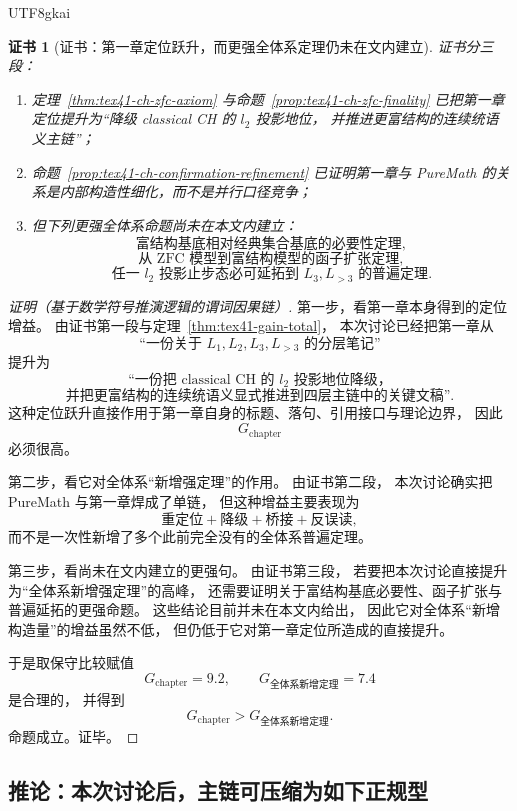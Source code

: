 \documentclass[12pt]{article}
\newtheorem{Certificate}{证书}[section]
\begin{document}
\begin{CJK*}{UTF8}{gkai}
\begin{Certificate}[证书：第一章定位跃升，而更强全体系定理仍未在文内建立]
\label{cert:tex41-gain-internal}
证书分三段：
\begin{enumerate}
  \item 定理~\ref{thm:tex41-ch-zfc-axiom} 与命题~\ref{prop:tex41-ch-zfc-finality} 已把第一章定位提升为“降级 classical CH 的 $l_2$ 投影地位，
    并推进更富结构的连续统语义主链”；
  \item 命题~\ref{prop:tex41-ch-confirmation-refinement} 已证明第一章与 PureMath 的关系是内部构造性细化，而不是并行口径竞争；
  \item 但下列更强全体系命题尚未在本文内建立：
\[
    \text{富结构基底相对经典集合基底的必要性定理},
\]
\[
    \text{从 ZFC 模型到富结构模型的函子扩张定理},
\]
\[
    \text{任一 }l_2\text{ 投影止步态必可延拓到 }L_3,L_{>3}\text{ 的普遍定理}.
\]
\end{enumerate}
\end{Certificate}

\begin{proof}[证明（基于数学符号推演逻辑的谓词因果链）]
第一步，看第一章本身得到的定位增益。
由证书第一段与定理~\ref{thm:tex41-gain-total}，
本次讨论已经把第一章从
\[
  \text{“一份关于 }L_1,L_2,L_3,L_{>3}\text{ 的分层笔记”}
\]
提升为
\[
  \text{“一份把 classical CH 的 }l_2\text{ 投影地位降级，}
\]
\[
  \text{并把更富结构的连续统语义显式推进到四层主链中的关键文稿”}.
\]
这种定位跃升直接作用于第一章自身的标题、落句、引用接口与理论边界，
因此
\[
  G_{\mathrm{chapter}}
\]
必须很高。

第二步，看它对全体系“新增强定理”的作用。
由证书第二段，
本次讨论确实把 PureMath 与第一章焊成了单链，
但这种增益主要表现为
\[
  \text{重定位}
  +
  \text{降级}
  +
  \text{桥接}
  +
  \text{反误读},
\]
而不是一次性新增了多个此前完全没有的全体系普遍定理。

第三步，看尚未在文内建立的更强句。
由证书第三段，
若要把本次讨论直接提升为“全体系新增强定理”的高峰，
还需要证明关于富结构基底必要性、函子扩张与普遍延拓的更强命题。
这些结论目前并未在本文内给出，
因此它对全体系“新增构造量”的增益虽然不低，
但仍低于它对第一章定位所造成的直接提升。

于是取保守比较赋值
\[
  G_{\mathrm{chapter}}=9.2,
  \qquad
  G_{\text{全体系新增定理}}=7.4
\]
是合理的，
并得到
\[
  G_{\mathrm{chapter}}
  >
  G_{\text{全体系新增定理}}.
\]
命题成立。证毕。
\end{proof}

\subsection{推论：本次讨论后，主链可压缩为如下正规型}
\label{subsec:tex41-ch2-corollary}


\end{CJK*}
\end{document}
